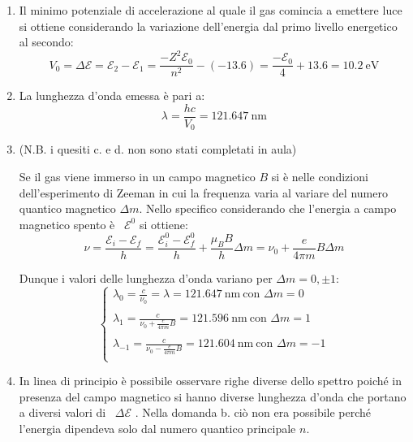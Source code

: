\documentclass[12pt,twoside,a4]{article}
\begin{document}
\begin{solution}
\vspace{-20pt}
\begin{enumerate}[label=(\textit{\roman*})]
	\item Il minimo potenziale di accelerazione al quale il gas comincia a emettere luce si ottiene considerando la variazione dell'energia dal primo livello energetico al secondo: \begin{equation*}
V_0 = \Delta \mathcal{E} = \mathcal{E}_2 - \mathcal{E}_1 = \frac{- Z^2 \mathcal{E}_0}{n^2} - (-  13.6) =  \frac{- \mathcal{E}_0}{4} + 13.6 = 10.2 \ \mathrm{eV}  
\end{equation*}

\item La lunghezza d'onda emessa è pari a: \begin{equation*}
\lambda = \frac{h c }{V_0} = 121.647 \ \mathrm{nm}    
\end{equation*}

\item (N.B. i quesiti c. e d. non sono stati completati in aula)

Se il gas viene immerso in un campo magnetico $B$ si è nelle condizioni dell'esperimento di Zeeman in cui la frequenza varia al variare del numero quantico magnetico $\Delta m$. Nello specifico considerando che l'energia a campo magnetico spento è \ $\mathcal{E}^0$  si ottiene:  \begin{equation*}
 \nu = \frac{\mathcal{E}_i - \mathcal{E}_f}{h} = \frac{\mathcal{E}^0_i - \mathcal{E}^0_f}{h} + \frac{\mu_B B}{h} \Delta m = \nu_0 + \frac{e}{4\pi m} B \Delta m   
\end{equation*}

\medskip
Dunque i valori delle lunghezza d'onda variano per $\Delta m = 0, \pm 1$: 
\begin{equation*}
\begin{cases}
    \lambda_0 = \frac{c}{\nu_0} = \lambda = 121.647 \ \mathrm{nm}  \  \text{con } \Delta m = 0 \\
    \\
    \lambda_1 = \frac{c}{\nu_0 + \frac{e}{4\pi m} B} = 121.596 \ \mathrm{nm}  \  \text{con } \Delta m = 1 \\
    \\
    \lambda_{-1} = \frac{c}{\nu_0 - \frac{e}{4\pi m} B} = 121.604 \ \mathrm{nm}  \  \text{con } \Delta m = -1 \\
\end{cases}    
\end{equation*}

\item In linea di principio è possibile osservare righe diverse dello spettro poiché in presenza del campo magnetico si hanno diverse lunghezza d'onda che portano a diversi valori di \ $\Delta \mathcal{E}$ . Nella domanda b. ciò non era possibile perché l'energia dipendeva solo dal numero quantico principale $n$.
\end{enumerate}
\end{solution}
\end{document}
